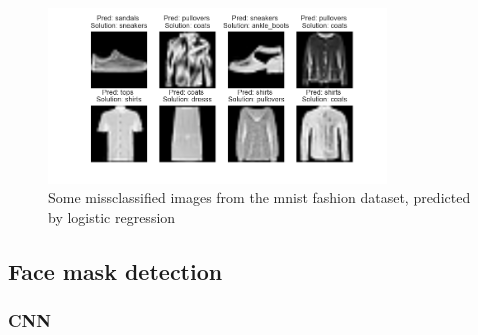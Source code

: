 \documentclass[../main.tex]{subfiles}
\begin{document}
\begin{figure}[H]
    \centering
    \includegraphics[width=0.8\textwidth]{doc/assets/logreg_missclassified_fasion.png}
    \caption{Some missclassified images from the mnist fashion dataset, predicted by logistic regression}
    \label{fig:missclassified_logreg_fashion}
\end{figure}

\subsection{Face mask detection}
\subsubsection{CNN}
\end{document}
